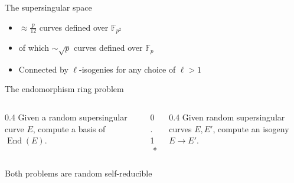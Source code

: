 \documentclass[aspectratio=169,12pt]{beamer}
\newcommand{\F}{\mathbb{F}}
\newcommand{\End}{\operatorname{End}}
\begin{document}
\begin{frame}
  \large\centering
\end{frame}


\begin{frame}{The supersingular space}
  \large
  \begin{itemize}
    \setlength{\itemsep}{2em}
  \item $\approx \frac{p}{12}$ curves defined over $\F_{p^2}$
  \item of which $\sim \sqrt{p}$ curves defined over $\F_p$
  \item Connected by $\ell$-isogenies for any choice of $\ell > 1$
  \end{itemize}
\end{frame}


\begin{frame}{The endomorphism ring problem}
  \large
  \begin{columns}
    \begin{column}{0.4\textwidth}
      Given a random supersingular curve $E$, compute a basis of
      $\End(E)$.
    \end{column}
    \begin{column}{0.1\textwidth}
      \huge
      \[\Leftrightarrow\]
    \end{column}
    \begin{column}{0.4\textwidth}
      Given random supersingular curves $E, E'$, compute an isogeny
      $E\to E'$.
    \end{column}
  \end{columns}

  \vfill
  \pause
  
  \begin{center}
    Both problems are random self-reducible    
  \end{center}
\end{frame}
\end{document}

